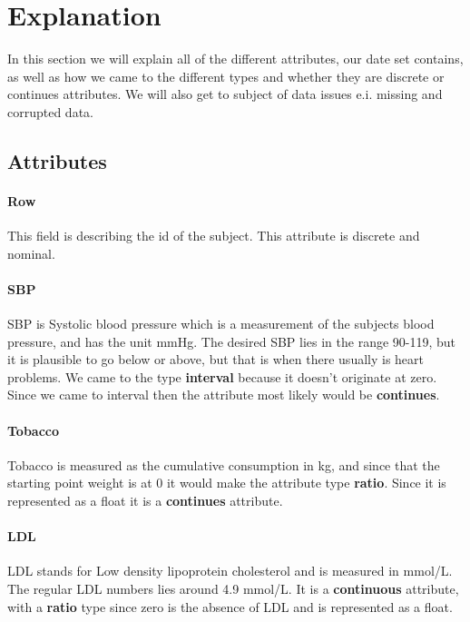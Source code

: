 \section{Explanation}

In this section we will explain all of the different attributes, our date set contains, as well as how we came to the different types and whether they are discrete or continues attributes. We will also get to subject of data issues e.i. missing and corrupted data.

\subsection{Attributes}

\paragraph{Row} This field is describing the id of the subject. This attribute is discrete and nominal.

\paragraph{SBP} SBP is Systolic blood pressure which is a measurement of the subjects blood pressure, and has the unit mmHg. The desired SBP lies in the range 90-119, but it is plausible to go below or above, but that is when there usually is heart problems.
We came to the type \textbf{interval} because it doesn't originate at zero. Since we came to interval then the attribute most likely would be \textbf{continues}.

\paragraph{Tobacco} Tobacco is measured as the cumulative consumption in kg, and since that the starting point weight is at 0 it would make the attribute type \textbf{ratio}. Since it is represented as a float it is a \textbf{continues} attribute.

\paragraph{LDL} LDL stands for Low density lipoprotein cholesterol and is measured in mmol/L. The regular LDL numbers lies around 4.9 mmol/L. It is a \textbf{continuous} attribute, with a \textbf{ratio} type since zero is the absence of LDL and is  represented as a float.

